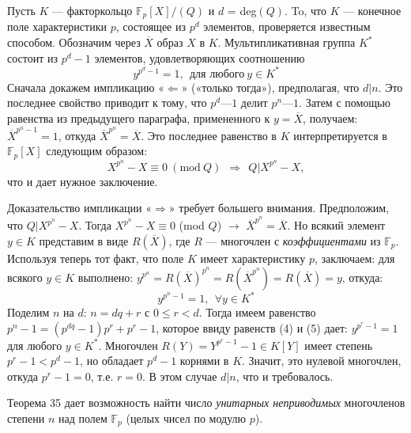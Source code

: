 \begin{myproof}
Пусть $K$ — факторкольцо $\mathbb{F}_p[X]\slash(Q)$ и $d$ = deg$(Q)$. To, что $K$ — 
конечное поле характеристики $p$, состоящее из $p^d$ элементов,  
проверяется известным способом. Обозначим через $\overline{X}$ образ $X$ в $K$. 
Мультипликативная группа $K^*$ состоит из $p^d - 1$ элементов,  
удовлетворяющих соотношению 
\begin{equation}
y^{p^d - 1} = 1,\:\: \text{для любого}\: y\in K^*
\end{equation}
Сначала докажем импликацию «$\Leftarrow$» («только тогда»), предполагая, 
что $d | n$. Это последнее свойство приводит к тому, что $p^d — 1$ делит 
$p^n — 1$. Затем с помощью равенства из предыдущего параграфа,  
примененного к $y = \overline{X}$, получаем: $\overline{X}^{p^n -1} = 1$, откуда $\overline{X}^{p^n} = \overline{X}$. 
Это последнее равенство в $K$ интерпретируется в $\mathbb{F}_p [X]$ следующим 
образом: 
\begin{equation*}
X^{p^n} - X \equiv 0\: (\text{mod}\: Q)\:\: \Rightarrow\:\: Q|X^{p^n} - X,
\end{equation*}
что и дает нужное заключение.

\noindent Доказательство импликации «$\Rightarrow$» требует большего внимания. 
Предположим, что $Q | X^{p^n} - X$. Тогда $X^{p^n} - X \equiv 0$ (mod $Q$) $\rightarrow$ 
$\overline{X}^{p^n} = \overline{X}$. Но всякий элемент $y\in K$ представим в виде $R(\overline{X})$, где $R$ 
— многочлен с \textit{коэффициентами} из $\mathbb{F}_p$. Используя теперь тот факт, 
что поле $K$ имеет характеристику $p$, заключаем: для всякого $y \in K$ 
выполнено: $y^{p^n} = R(\overline{X})^{p^n} = R(\overline{X}^{p^n}) = R(\overline{X}) = y$, откуда: 
\begin{equation}
y^{p^n - 1} = 1,\:\: \forall y \in K^*
\end{equation}
Поделим $n$ на $d$: $n = dq + r$ с $0\leqslant r < d$. Тогда имеем равенство
$p^n - 1 = (p^{dq} - 1)p^r + p^r - 1$, которое ввиду равенств (4) и (5) дает:
$y^{p^r - 1} = 1$ для любого $y \in K^*$. Многочлен $R(Y) = Y^{p^r -1} - 1 \in K[Y]$
имеет степень $p^r - 1 < p^d - 1$, но обладает $p^d - 1$ корнями в $K$.
Значит, это нулевой многочлен, откуда $p^r - 1 = 0$, т.е. $r = 0$. В этом
случае $d | n$, что и требовалось.
\end{myproof}

Теорема 35 дает возможность найти число \textit{унитарных неприводимых}
многочленов степени $n$ над полем $\mathbb{F}_p$ (целых чисел по модулю $p$).
 
